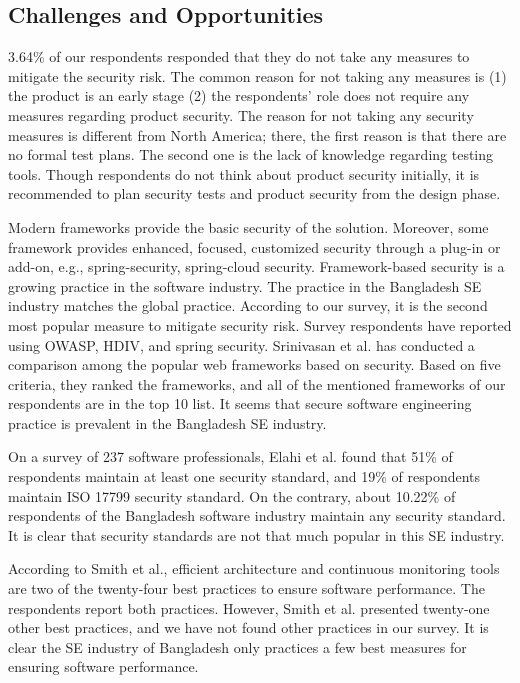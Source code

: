 \subsection{Challenges and Opportunities}
\label{dicussion challanges}

3.64\% of our respondents responded that they do not take any measures to mitigate the security risk. The common reason for not taking any measures is (1) the product is an early stage (2) the respondents' role does not require any measures regarding product security. The reason for not taking any security measures is different from North America\cite{Assal2019}; there, the first reason is that there are no formal test plans. The second one is the lack of knowledge regarding testing tools. Though respondents do not think about product security initially, it is recommended\cite{Chandra2009,Azham2011} to plan security tests and product security from the design phase.

Modern frameworks provide the basic security of the solution. Moreover, some framework provides enhanced, focused, customized security through a plug-in or add-on, e.g., spring-security, spring-cloud security. Framework-based security is a growing practice in the software industry\cite{Alssir2012}.  The practice in the Bangladesh SE industry matches the global practice. According to our survey, it is the second most popular measure to mitigate security risk. Survey respondents have reported using OWASP, HDIV, and spring security. Srinivasan et al.\cite{Srinivasan2017} has conducted a comparison among the popular web frameworks based on security. Based on five criteria, they ranked the frameworks, and all of the mentioned frameworks of our respondents are in the top 10 list. It seems that secure software engineering practice is prevalent in the Bangladesh SE industry.


On a survey of 237 software professionals, Elahi et al.\cite{Elahi2011} found that 51\% of respondents maintain at least one security standard, and 19\% of respondents maintain ISO 17799 security standard. On the contrary, about 10.22\% of respondents of the Bangladesh software industry maintain any security standard. It is clear that security standards are not that much popular in this SE industry.

According to Smith et al.\cite{Smith2003}, efficient architecture and continuous monitoring tools are two of the twenty-four best practices to ensure software performance.  The respondents report both practices. However, Smith et al. presented twenty-one other best practices, and we have not found other practices in our survey. It is clear the SE industry of Bangladesh only practices a few best measures for ensuring software performance.

